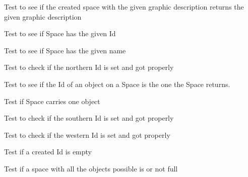 \begin{DoxyRefList}
\item[\label{test__test000235}%
\hypertarget{test__test000235}{}%
Member \hyperlink{space__test_8h_a4279d034f757a350dcaa9604903b179b}{test1\+\_\+space\+\_\+get\+\_\+graphic\+\_\+description} ()]Test to see if the created space with the given graphic description returns the given graphic description  
\item[\label{test__test000225}%
\hypertarget{test__test000225}{}%
Member \hyperlink{space__test_8h_a920df9e02482f4f1e6a5ebcaec523860}{test1\+\_\+space\+\_\+get\+\_\+id} ()]Test to see if Space has the given Id  
\item[\label{test__test000223}%
\hypertarget{test__test000223}{}%
Member \hyperlink{space__test_8h_ad12c42523c517507566c5c68b1527689}{test1\+\_\+space\+\_\+get\+\_\+name} ()]Test to see if Space has the given name  
\item[\label{test__test000227}%
\hypertarget{test__test000227}{}%
Member \hyperlink{space__test_8h_a3a87f1e1e173d622bfbd3bcd14e060ca}{test1\+\_\+space\+\_\+get\+\_\+north} ()]Test to check if the northern Id is set and got properly  
\item[\label{test__test000239}%
\hypertarget{test__test000239}{}%
Member \hyperlink{space__test_8h_ab47960fac6126d77d7b3d163177bbd4f}{test1\+\_\+space\+\_\+get\+\_\+object\+\_\+id} ()]Test to see if the Id of an object on a Space is the one the Space returns.  
\item[\label{test__test000241}%
\hypertarget{test__test000241}{}%
Member \hyperlink{space__test_8h_a99dcb9ec68282e5488ea34997a213783}{test1\+\_\+space\+\_\+get\+\_\+objects\+\_\+number} ()]Test if Space carries one object  
\item[\label{test__test000229}%
\hypertarget{test__test000229}{}%
Member \hyperlink{space__test_8h_a8e345065f58565e131bdb3a9d0096ed5}{test1\+\_\+space\+\_\+get\+\_\+south} ()]Test to check if the southern Id is set and got properly  
\item[\label{test__test000233}%
\hypertarget{test__test000233}{}%
Member \hyperlink{space__test_8h_a1f08c6866885bfc093717f57b1b86539}{test1\+\_\+space\+\_\+get\+\_\+west} ()]Test to check if the western Id is set and got properly  
\item[\label{test__test000247}%
\hypertarget{test__test000247}{}%
Member \hyperlink{space__test_8h_af6acddb4ba70ed941100be42d8f40b38}{test1\+\_\+space\+\_\+is\+\_\+empty} ()]Test if a created Id is empty  
\item[\label{test__test000250}%
\hypertarget{test__test000250}{}%
Member \hyperlink{space__test_8h_a9b23efa95cd3c18574cc8c1ef83ae7a9}{test1\+\_\+space\+\_\+is\+\_\+full} ()]Test if a space with all the objects possible is or not full  

\end{DoxyRefList}
